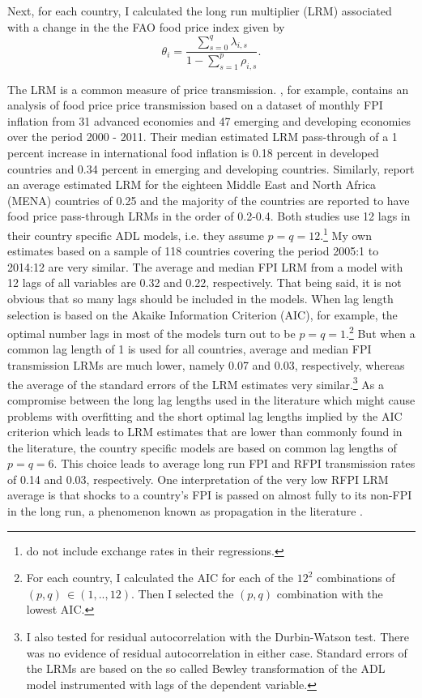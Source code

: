 \documentclass[12pt,english]{article}
\begin{document}
Next, for each country, I calculated the long run multiplier (LRM) associated with a change in the the FAO food price index given by
\begin{equation}
\theta_{i}=\frac{\sum_{s=0}^{q}\lambda_{i,s}}{1-\sum_{s=1}^{p}\rho_{i,s}}.
\end{equation}


The LRM is a common measure of price transmission. \cite{IMF2011}, for example, contains an analysis of food price price transmission based on a dataset of monthly FPI inflation from 31 advanced economies and 47 emerging and developing economies over the period 2000 - 2011. Their median estimated LRM pass-through of a 1 percent increase in international food inflation is 0.18 percent in developed countries and 0.34 percent in emerging and developing countries. Similarly, \citet{Ianchovichina2014} report an average estimated LRM for the eighteen Middle East and North Africa (MENA) countries of 0.25 and the majority of the countries are reported to have  food price pass-through LRMs in the order of 0.2-0.4. Both studies use 12 lags in their country specific ADL models, i.e. they assume $p=q=12$.\footnote{\cite{IMF2011} do not include exchange rates in their regressions.} My own estimates based on a sample of 118 countries covering the period 2005:1 to 2014:12 are very similar. The average and median FPI LRM from a model with 12 lags of all variables are 0.32 and 0.22, respectively. That being said, it is not obvious that so many lags should be included in the models. When lag length selection is based on the Akaike Information Criterion (AIC), for example, the optimal number lags in most of the models turn out to be $p=q=1$.\footnote{For each country, I calculated the AIC for each of the $12^2$ combinations of $(p,q)\, \in (1,..,12)$. Then I selected the $(p,q)$ combination with the lowest AIC.} But when a common lag length of 1 is used for all countries, average and median FPI transmission LRMs are much lower, namely 0.07 and 0.03, respectively, whereas the average of the standard errors of the LRM estimates very similar.\footnote{I also tested for residual autocorrelation with the Durbin-Watson test. There was no evidence of residual autocorrelation in either case. Standard errors of the LRMs are based on the so called Bewley transformation of the ADL model instrumented with lags of the dependent variable.} As a compromise between the long lag lengths used in the literature which might cause problems with overfitting and the short optimal lag lengths implied by the AIC criterion which leads to LRM estimates that are lower than commonly found in the literature, the country specific models are based on common lag lengths of $p=q=6$. This choice leads to average long run FPI and RFPI transmission rates of 0.14 and 0.03, respectively. One interpretation of the very low RFPI LRM average is that shocks to a country's FPI is passed on almost fully to its non-FPI in the long run, a phenomenon known as propagation in the literature \citep[e.g.][]{pedersen10}.
\end{document}
